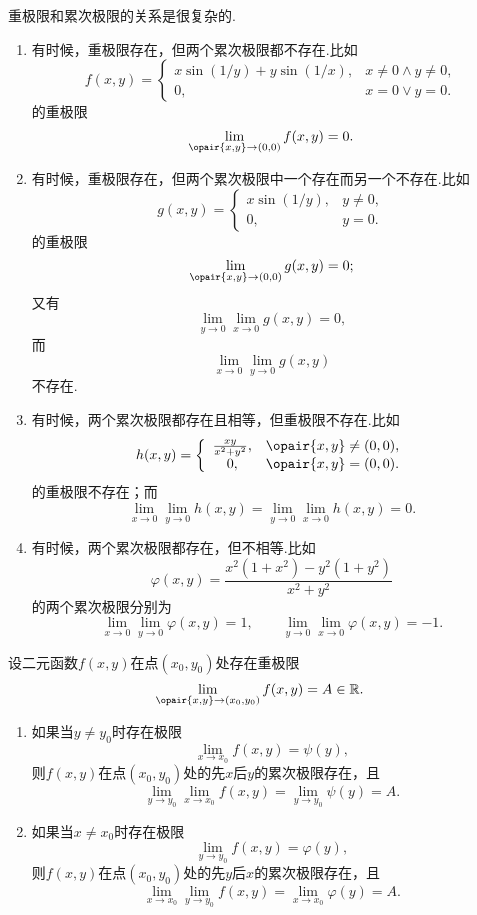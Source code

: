 \begin{example}
重极限和累次极限的关系是很复杂的.
\begin{enumerate}
\item 有时候，重极限存在，但两个累次极限都不存在.比如\[
f(x,y) = \left\{ \begin{array}{cl}
x \sin(1/y) + y \sin(1/x), & x\neq0 \land y\neq0, \\
0, & x=0 \lor y=0.
\end{array} \right.
\]的重极限\[
\lim\limits_{\opair{x,y}\to(0,0)} f(x,y) = 0.
\]

\item 有时候，重极限存在，但两个累次极限中一个存在而另一个不存在.比如\[
g(x,y) = \left\{ \begin{array}{cl}
x \sin(1/y), & y\neq0, \\
0, & y=0.
\end{array} \right.
\]的重极限\[
\lim\limits_{\opair{x,y}\to(0,0)} g(x,y) = 0;
\]又有\[
\lim\limits_{y\to0} \lim\limits_{x\to0} g(x,y) = 0,
\]而\[
\lim\limits_{x\to0} \lim\limits_{y\to0} g(x,y)
\]不存在.

\item 有时候，两个累次极限都存在且相等，但重极限不存在.比如\[
h(x,y) = \left\{ \begin{array}{cl}
\frac{xy}{x^2+y^2}, & \opair{x,y}\neq(0,0), \\
0, & \opair{x,y}=(0,0).
\end{array} \right.
\]的重极限不存在；而\[
\lim\limits_{x\to0} \lim\limits_{y\to0} h(x,y)
= \lim\limits_{y\to0} \lim\limits_{x\to0} h(x,y) = 0.
\]

\item 有时候，两个累次极限都存在，但不相等.比如\[
\varphi(x,y) = \frac{x^2(1+x^2) - y^2(1+y^2)}{x^2+y^2}
\]的两个累次极限分别为\[
\lim\limits_{x\to0} \lim\limits_{y\to0} \varphi(x,y) = 1,
\qquad
\lim\limits_{y\to0} \lim\limits_{x\to0} \varphi(x,y) = -1.
\]
\end{enumerate}
\end{example}

\begin{theorem}
设二元函数\(f(x,y)\)在点\((x_0,y_0)\)处存在重极限\[
\lim\limits_{\opair{x,y}\to(x_0,y_0)} f(x,y) = A \in \mathbb{R}.
\]\begin{enumerate}
\item 如果当\(y \neq y_0\)时存在极限\[
\lim\limits_{x \to x_0} f(x,y) = \psi(y),
\]则\(f(x,y)\)在点\((x_0,y_0)\)处的先\(x\)后\(y\)的累次极限存在，且\[
\lim\limits_{y \to y_0} \lim\limits_{x \to x_0} f(x,y)
= \lim\limits_{y \to y_0} \psi(y) = A.
\]

\item 如果当\(x \neq x_0\)时存在极限\[
\lim\limits_{y \to y_0} f(x,y) = \varphi(y),
\]则\(f(x,y)\)在点\((x_0,y_0)\)处的先\(y\)后\(x\)的累次极限存在，且\[
\lim\limits_{x \to x_0} \lim\limits_{y \to y_0} f(x,y)
= \lim\limits_{x \to x_0} \varphi(y) = A.
\]
\end{enumerate}
\end{theorem}

